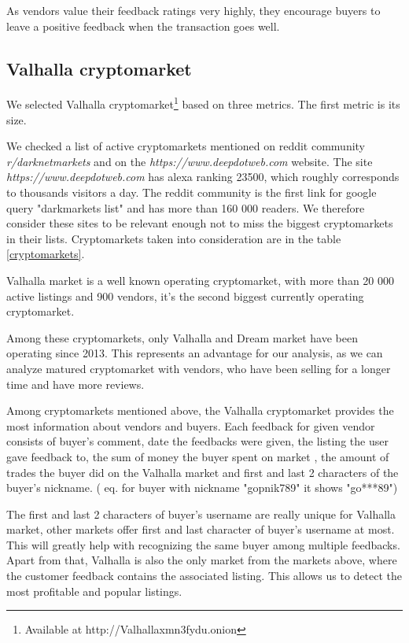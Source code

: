 \documentclass[
  digital, %
  table,   %
  lof,     %
  lot,     %
  oneside
]{fithesis3}
\begin{document}
As vendors value their feedback ratings very highly, they encourage buyers to leave a positive feedback when the transaction goes well.
 
\subsection{Valhalla cryptomarket}

We selected Valhalla cryptomarket\footnote{Available at http://Valhallaxmn3fydu.onion} based on three metrics.
The first metric is its size.

We checked a list of active cryptomarkets mentioned on reddit community \emph{r/darknetmarkets} and on the 
\emph{https://www.deepdotweb.com} website.
The site \emph{https://www.deepdotweb.com} has alexa ranking 23500, which roughly corresponds to thousands visitors a day.
The reddit community is the first link for google query "darkmarkets list" and 
has more than 160 000 readers. We therefore consider these sites to be relevant enough not to miss
the biggest cryptomarkets in their lists. Cryptomarkets taken into consideration are in the table \ref{cryptomarkets}.

Valhalla market is a well known operating cryptomarket, with more than 20 000 active listings and 900 vendors, it's the second biggest currently operating cryptomarket.

Among these cryptomarkets, only Valhalla and Dream market have been operating since 2013.
This represents an advantage for our analysis, as we can analyze matured cryptomarket with vendors,
who have been selling for a longer time and have more reviews.

Among cryptomarkets mentioned above,
the Valhalla cryptomarket provides the most information about vendors and buyers.
Each feedback for given vendor consists of 
buyer's comment, date the feedbacks were given, the listing the user gave feedback to, the sum of money the buyer spent on market
, the amount of trades the buyer did on the Valhalla market and
first and last 2 characters of the buyer's nickname. 
( eq. for buyer with nickname "gopnik789" it shows "go***89")

The first and last 2 characters of buyer's username are really unique for Valhalla market,
other markets offer first and last character of buyer's username at most.
This will greatly help with recognizing the same buyer among multiple feedbacks.
Apart from that, Valhalla is also the only market from the markets above, where the customer feedback contains the
associated listing.
This allows us to detect the most profitable and popular listings.
\end{document}
